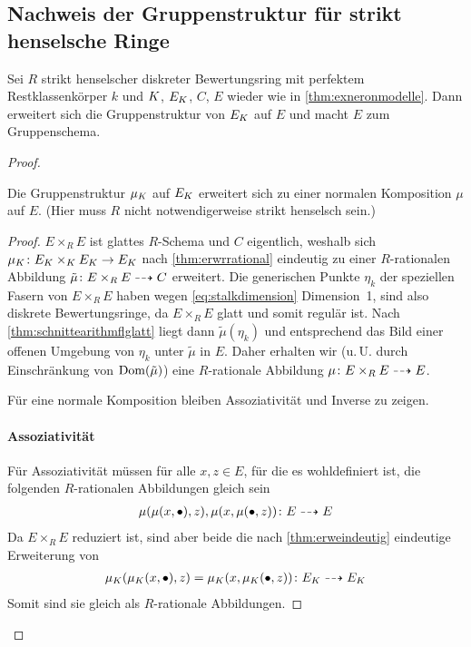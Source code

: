 \documentclass[german]{scrreprt}
\begin{document}
\subsection{Nachweis der Gruppenstruktur für strikt henselsche Ringe}
\begin{Satz}\label{thm:egruppenschema}
  Sei $R$ strikt henselscher diskreter Bewertungsring mit perfektem
  Restklassenkörper $k$ und $K$, $E_{K}$, $C$, $E$ wieder wie in
  \ref{thm:exneronmodelle}.
  Dann erweitert sich die Gruppenstruktur von $E_{K}$ auf $E$ und macht
  $E$ zum Gruppenschema.
  \begin{proof}
    \begin{Lemma}
      Die Gruppenstruktur $\mu_{K}$ auf $E_{K}$ erweitert sich zu einer
      normalen Komposition $\mu$ auf $E$.
      (Hier muss $R$ nicht notwendigerweise strikt henselsch sein.)
      \begin{proof}
        $E\times_R E$ ist glattes $R$-Schema und $C$ eigentlich,
        weshalb sich $\mu_{K}\colon E_{K}\times_{K} E_{K}\to E_{K}$ nach
        \ref{thm:erwrrational} eindeutig zu einer $R$-rationalen
        Abbildung $\tilde\mu\colon E\times_R E\dashrightarrow C$ erweitert.
        Die generischen Punkte $\eta_k$ der speziellen Fasern von
        $E\times_R E$ haben wegen \ref{eq:stalkdimension}
        Dimension~1, sind also diskrete Bewertungsringe, da
        $E\times_R E$ glatt und somit regulär ist. Nach
        \ref{thm:schnittearithmflglatt} liegt dann
        $\tilde\mu(\eta_k)$ und entsprechend das Bild einer offenen
        Umgebung von $\eta_k$ unter $\tilde\mu$ in $E$. Daher erhalten
        wir (u.\,U. durch Einschränkung von $\operatorname{Dom}(\tilde\mu)$) eine
        $R$-rationale Abbildung $\mu\colon E\times_R E\dashrightarrow E$.

        Für eine normale Komposition bleiben Assoziativität und Inverse zu
        zeigen.

        \paragraph{Assoziativität}
        Für Assoziativität müssen für alle $x, z\in E$, für die es
        wohldefiniert ist, die folgenden $R$-rationalen 
        Abbildungen gleich sein
        \begin{gather*}
          \mu(\mu(x,\bullet),z), \mu(x,\mu(\bullet,z))
          \colon E \dashrightarrow E
        \end{gather*}
        Da $E\times_R E$ reduziert ist, sind aber beide die nach
        \ref{thm:erweindeutig} eindeutige Erweiterung von
        \begin{gather*}
          \mu_{K}(\mu_{K}(x,\bullet),z)=\mu_{K}(x,\mu_{K}(\bullet,z))
          \colon E_{K} \dashrightarrow E_{K}
        \end{gather*}
        Somit sind sie gleich als $R$-rationale Abbildungen.
        

\end{proof}
\end{Lemma}
\end{proof}
\end{Satz}
\end{document}
